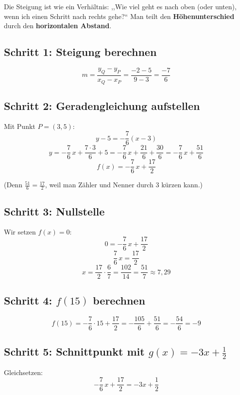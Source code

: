 \documentclass[12pt,a4paper]{article}
\begin{document}
\begin{analogie}
Die Steigung ist wie ein Verh\"altnis: ,,Wie viel geht es nach oben (oder unten), wenn ich einen Schritt nach rechts gehe?`` Man teilt den \textbf{H\"ohenunterschied} durch den \textbf{horizontalen Abstand}.
\end{analogie}

\subsection{Schritt 1: Steigung berechnen}

\[
  m = \frac{y_Q - y_P}{x_Q - x_P} = \frac{-2 - 5}{9 - 3} = \frac{-7}{6}
\]

\subsection{Schritt 2: Geradengleichung aufstellen}

Mit Punkt $P = (3, 5)$:
\[
  y - 5 = -\frac{7}{6}(x - 3)
\]
\[
  y = -\frac{7}{6}\,x + \frac{7 \cdot 3}{6} + 5 = -\frac{7}{6}\,x + \frac{21}{6} + \frac{30}{6} = -\frac{7}{6}\,x + \frac{51}{6}
\]
\[
  \boxed{f(x) = -\frac{7}{6}\,x + \frac{17}{2}}
\]

(Denn $\frac{51}{6} = \frac{17}{2}$, weil man Z\"ahler und Nenner durch 3 k\"urzen kann.)

\subsection{Schritt 3: Nullstelle}

Wir setzen $f(x) = 0$:
\[
  0 = -\frac{7}{6}\,x + \frac{17}{2}
\]
\[
  \frac{7}{6}\,x = \frac{17}{2}
\]
\[
  x = \frac{17}{2} \cdot \frac{6}{7} = \frac{102}{14} = \frac{51}{7} \approx 7{,}29
\]

\subsection{Schritt 4: $f(15)$ berechnen}

\[
  f(15) = -\frac{7}{6} \cdot 15 + \frac{17}{2} = -\frac{105}{6} + \frac{51}{6} = -\frac{54}{6} = -9
\]

\subsection{Schritt 5: Schnittpunkt mit $g(x) = -3x + \tfrac{1}{2}$}

Gleichsetzen:
\[
  -\frac{7}{6}\,x + \frac{17}{2} = -3x + \frac{1}{2}
\]
\end{document}
